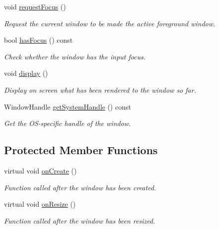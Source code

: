 \begin{DoxyCompactItemize}
void \hyperlink{classsf_1_1_window_a58cf7fa1775e8e7542032e3ecfa83b49}{request\+Focus} ()
\begin{DoxyCompactList}\small\item\em Request the current window to be made the active foreground window. \end{DoxyCompactList}\item 
bool \hyperlink{classsf_1_1_window_ad8db2e6500d13ca9396281296404ba31}{has\+Focus} () const
\begin{DoxyCompactList}\small\item\em Check whether the window has the input focus. \end{DoxyCompactList}\item 
void \hyperlink{classsf_1_1_window_adabf839cb103ac96cfc82f781638772a}{display} ()
\begin{DoxyCompactList}\small\item\em Display on screen what has been rendered to the window so far. \end{DoxyCompactList}\item 
Window\+Handle \hyperlink{classsf_1_1_window_ad2fa6be5104ec0bfe79af7a5f524ea90}{get\+System\+Handle} () const
\begin{DoxyCompactList}\small\item\em Get the O\+S-\/specific handle of the window. \end{DoxyCompactList}\end{DoxyCompactItemize}
\subsection*{Protected Member Functions}
\begin{DoxyCompactItemize}
\item 
virtual void \hyperlink{classsf_1_1_window_a106633b9be49b27f83d4712689b493eb}{on\+Create} ()
\begin{DoxyCompactList}\small\item\em Function called after the window has been created. \end{DoxyCompactList}\item 
virtual void \hyperlink{classsf_1_1_window_a10f567a387da7b49f417f73321fcf64d}{on\+Resize} ()
\begin{DoxyCompactList}\small\item\em Function called after the window has been resized. \end{DoxyCompactList}\end{DoxyCompactItemize}



